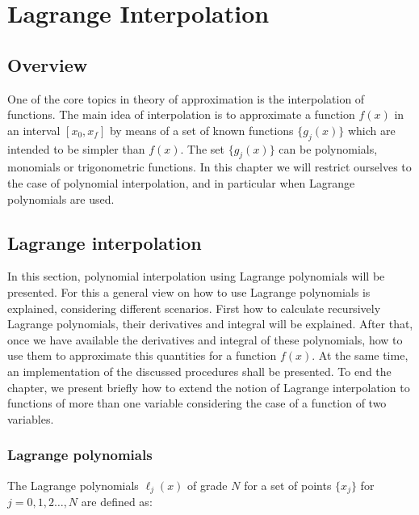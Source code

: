 
    
    \chapter{Lagrange Interpolation } \label{dev:Interpolation}
    \section{Overview}
    One of the core topics in theory of approximation is the interpolation of functions. The main idea of interpolation is to approximate a function $f(x)$ in an interval $[x_0,x_f]$ by means of a set of known functions $\{g_j(x)\}$ which are intended to be simpler than $f(x)$. The set $\{g_j(x)\}$ can be polynomials, monomials or trigonometric functions. In this chapter we will restrict ourselves to the case of polynomial interpolation, and in particular when Lagrange polynomials are used. 
    
    
    
    \section{Lagrange interpolation}
    
    In this section, polynomial interpolation using Lagrange polynomials will be presented. For this a general view on how to use Lagrange polynomials is explained, considering different scenarios. First how to calculate recursively Lagrange polynomials, their derivatives and integral will be explained. After that, once we have available the derivatives and integral of these polynomials, how to use them to approximate this quantities for a function $f(x)$. At the same time, an implementation of the discussed procedures shall be presented. To end the chapter, we present briefly how to extend the notion of Lagrange interpolation to functions of more than one variable considering the case of a function of two variables. 
    
    \subsection{Lagrange polynomials}
    
    The Lagrange polynomials $\ell_j(x)$ of grade $N$ for a set of points $\{x_j\}$ for $j=0,1,2\ldots,N$ are defined as:
    
